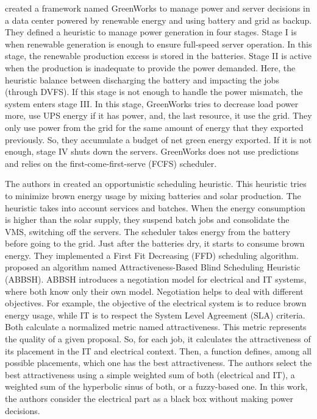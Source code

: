 \citeauthor{li2016managing} \cite{li2016managing} created a framework named GreenWorks to manage power and server decisions in a data center powered by renewable energy and using battery and grid as backup. They defined a heuristic to manage power generation in four stages. Stage I is when renewable generation is enough to ensure full-speed server operation. In this stage, the renewable production excess is stored in the batteries. Stage II is active when the production is inadequate to provide the power demanded. Here, the heuristic balance between discharging the battery and impacting the jobs (through DVFS). If this stage is not enough to handle the power mismatch, the system enters stage III. In this stage, GreenWorks tries to decrease load power more, use UPS energy if it has power, and, the last resource, it use the grid. They only use power from the grid for the same amount of energy that they exported previously. So, they accumulate a budget of net green energy exported. If it is not enough, stage IV shuts down the servers. GreenWorks does not use predictions and relies on the first-come-first-serve (FCFS) scheduler.

The authors in \cite{li2017balancing} created an opportunistic scheduling heuristic. This heuristic tries to minimize brown energy usage by mixing batteries and solar production. The heuristic takes into account services and batches. When the energy consumption is higher than the solar supply, they suspend batch jobs and consolidate the VMS, switching off the servers. The scheduler takes energy from the battery before going to the grid. Just after the batteries dry, it starts to consume brown energy. They implemented a First Fit Decreasing (FFD) scheduling algorithm. \citeauthor{grange2018green} \cite{grange2018green} proposed an algorithm named Attractiveness-Based Blind Scheduling Heuristic (ABBSH). ABBSH introduces a negotiation model for electrical and IT systems, where both know only their own model. Negotiation helps to deal with different objectives. For example, the objective of the electrical system is to reduce brown energy usage, while IT is to respect the System Level Agreement (SLA) criteria. Both calculate a normalized metric named attractiveness. This metric represents the quality of a given proposal. So, for each job, it calculates the attractiveness of its placement in the IT and electrical context. Then, a function defines, among all possible placements, which one has the best attractiveness. The authors select the best attractiveness using a simple weighted sum of both (electrical and IT), a weighted sum of the hyperbolic sinus of both, or a fuzzy-based one. In this work, the authors consider the electrical part as a black box without making power decisions.

